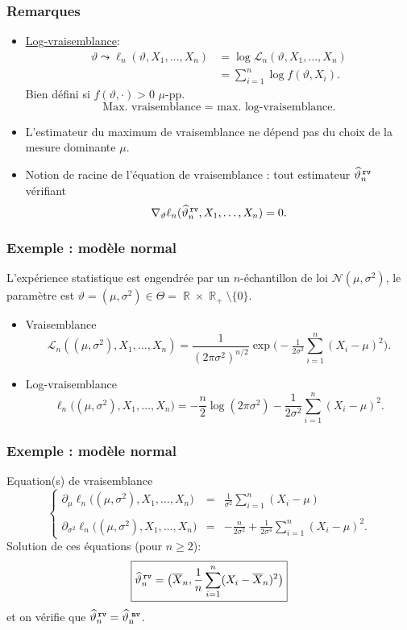 ﻿\documentclass{beamer}
\DeclareMathOperator{\R}{{\mathbb R}}
\DeclareMathOperator{\estMV}{\widehat \vartheta_n^{\,\,{\tt mv}}}
\begin{document}
\begin{frame}
\frametitle{Remarques}
\begin{itemize}
\item \underline{Log-vraisemblance}:
\begin{align*}\vartheta \leadsto \ell_n(\vartheta, X_1,\ldots, X_n)& = \log {\mathcal L}_n(\vartheta, X_1,\ldots, X_n)\\
& = \sum_{i = 1}^n \log f(\vartheta, X_i).
\end{align*}
{\color{red}Bien défini} si $f(\vartheta, \cdot) >0$ $\mu$-pp.
$$\text{Max. vraisemblance = max. log-vraisemblance.}$$
\item L'estimateur du maximum de vraisemblance {\color{red} ne dépend pas} du choix de la mesure dominante $\mu$.
\item Notion de {\color{red} racine de l'équation de vraisemblance} : tout estimateur $\widehat \vartheta_n^{\,{\tt rv}}$ vérifiant
$$\nabla_\vartheta \ell_n(\widehat \vartheta_n^{\,{\tt rv}}, X_1,\ldots, X_n) = 0.$$
\end{itemize}
\end{frame}

\begin{frame}
\frametitle{Exemple : modèle normal } L'expérience statistique est
engendrée par un $n$-échantillon de loi ${\mathcal
N}(\mu,\sigma^2)$, le paramètre est $\vartheta = (\mu,\sigma^2)\in
\Theta = \R\times \R_+\setminus\{0\}$.
\begin{itemize}
\item
{\color{red}Vraisemblance} $${\mathcal L}_n((\mu,\sigma^2),
X_1,\ldots, X_n) =
\frac1{(2\pi\sigma^2)^{n/2}}\exp\big(-\tfrac{1}{2\sigma^2}
\sum_{i=1}^n(X_i-\mu)^2\big).$$
\item {\color{red}Log-vraisemblance}
$$\ell_n\big((\mu,\sigma^2),X_1,\ldots, X_n\big) = -\frac{n}{2}
\log(2\pi \sigma^2)-\frac{1}{2\sigma^2}\sum_{i = 1}^n (X_i-\mu)^2.$$
\end{itemize}
\end{frame}

\begin{frame}
\frametitle{Exemple : modèle normal }
{\color{red}Equation(s) de vraisemblance}
$$
\left\{
\begin{array}{lll}
\partial_\mu\ell_n \big((\mu,\sigma^2),X_1,\ldots, X_n\big) & = &\displaystyle\frac{1}{\sigma^2}\sum_{i = 1}^n (X_i-\mu) \\ \\
\partial_{\sigma^2}\ell_n \big((\mu,\sigma^2),X_1,\ldots, X_n\big)&
 = &\displaystyle -\frac{n}{2\sigma^2}+\frac{1}{2\sigma^4}
 \sum_{i = 1}^n (X_i-\mu)^2.
\end{array}
\right.
$$
Solution de ces \'equations (pour $n \geq 2$):
$$\boxed{\widehat
\vartheta_n^{\,{\tt rv}} = \big(\overline{X}_n,\frac{1}{n} \sum_{i =
1}^n(X_i-\overline{X}_n)^2\big)}$$ et on vérifie que $\widehat
\vartheta_n^{\,{\tt rv}} =\estMV$.
\end{frame}
\end{document}
